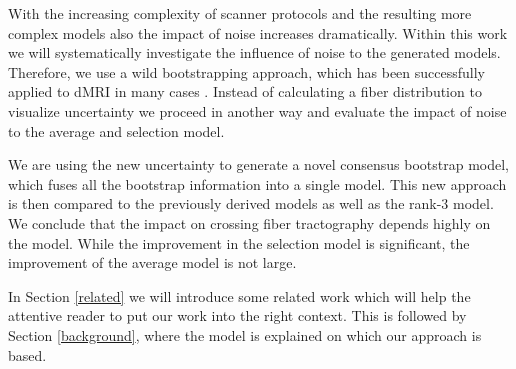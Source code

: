 With the increasing complexity of scanner protocols and the resulting more
complex models also the impact of noise increases dramatically. Within this work
we will systematically investigate the influence of noise to the generated
models. Therefore, we use a wild bootstrapping approach, which has been
successfully applied to dMRI in many cases \cite{Jones:2008}. Instead of
calculating a fiber distribution to visualize uncertainty we proceed in
another way and evaluate the impact of noise to the average and selection model.

We are using the new uncertainty to generate a novel consensus bootstrap
model, which fuses all the bootstrap information into a single model. This new
approach is then compared to the previously derived models as well as the
rank-$3$ model. We conclude that the
impact on crossing fiber tractography depends highly on the model. While the
improvement in the selection model is significant, the improvement of the
average model is not large. 

In Section \ref{related} we will introduce some related work which will help the attentive
reader to put our work into the right context. This is followed by Section
\ref{background}, where the model is explained on which our approach is based.
